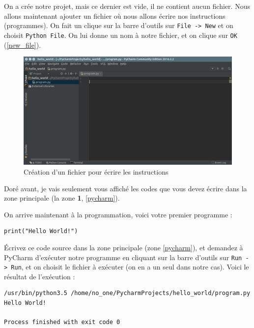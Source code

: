 \documentclass[12pt]{article}
\newcommand{\code}[1]{\colorbox{light-gray}{\texttt{#1}}}
\begin{document}
        On a crée notre projet, mais ce dernier est vide, il ne contient aucun fichier. Nous allons maintenant ajouter
        un fichier où nous allons écrire nos instructions (programmes). On fait un clique sur la barre d'outils sur
        \code{File -> New} et on choisit \code{Python File}. On lui donne un nom à notre fichier, et on clique sur 
        \code{OK} (\autoref{new_file}).

        \begin{figure}[H]
            \centering
            \includegraphics[width=\linewidth]{img/10_new_file.png}
            \caption{Création d'un fichier pour écrire les instructions}
            \label{new_file}
        \end{figure}

        Doré avant, je vais seulement vous affiché les codes que vous devez écrire dans la zone principale (la zone 
        \textbf{1}, \autoref{pycharm}).

        On arrive maintenant à la programmation, voici votre premier programme :
        \begin{lstlisting}[style=code]
print("Hello World!")
        \end{lstlisting}

        Écrivez ce code source dans la zone principale (zone  \autoref{pycharm}), et demandez à PyCharm 
        d'exécuter notre programme en cliquant sur la barre d'outils sur \code{Run -> Run}, et on choisit le fichier
        à exécuter (on en a un seul dans notre cas). Voici le résultat de l'exécution :

        \begin{lstlisting}[style=exec_result]
/usr/bin/python3.5 /home/no_one/PycharmProjects/hello_world/program.py
Hello World!

Process finished with exit code 0
        \end{lstlisting}
\end{document}
